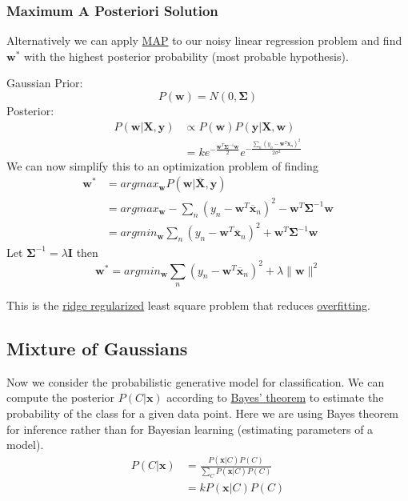\documentclass[12pt]{article}
\begin{document}
        \subsubsection{Maximum A Posteriori Solution}
            Alternatively we can apply \hyperref[sec:MAP]{MAP} to our noisy linear regression problem and find
            $\boldsymbol{w}^*$ with the highest posterior probability (most probable hypothesis).
            
            Gaussian Prior:
            $$ P(\boldsymbol{w}) = N(0, \boldsymbol{\Sigma}) $$ Posterior:
            \begin{align*}
                P(\boldsymbol{w} | \boldsymbol{X}, \boldsymbol{y}) &\propto P(\boldsymbol{w})P(\boldsymbol{y}|\boldsymbol{X}, \boldsymbol{w}) \\
                &= ke^{-\frac{\boldsymbol{w}^T\boldsymbol{\Sigma}^{-1}\boldsymbol{w}}{2}} e^{-\frac{\sum_n(y_n - \boldsymbol{w}^T\boldsymbol{x}_n)^2}{2\sigma^2}}
            \end{align*}
            We can now simplify this to an optimization problem of finding
            \begin{align*}
                \boldsymbol{w}^* &= argmax_{\boldsymbol{w}}P(\boldsymbol{w}|\overline{\boldsymbol{X}}, \boldsymbol{y}) \\
                &= argmax_{\boldsymbol{w}} - \sum_{n} (y_n - \boldsymbol{w}^T\overline{\boldsymbol{x}}_n)^2 - \boldsymbol{w}^T \boldsymbol{\Sigma}^{-1}\boldsymbol{w} \\
                &= argmin_{\boldsymbol{w}} \sum_{n} (y_n - \boldsymbol{w}^T \overline{\boldsymbol{x}}_n)^2 + \boldsymbol{w}^T \boldsymbol{\Sigma}^{-1}\boldsymbol{w}
            \end{align*}
            Let $\boldsymbol{\Sigma}^{-1} = \lambda \boldsymbol{I}$ then
            $$ \boldsymbol{w}^* = argmin_{\boldsymbol{w}} \sum_{n} (y_n - \boldsymbol{w}^T
            \overline{\boldsymbol{x}}_n)^2 + \lambda \|\boldsymbol{w}\|^2 $$

            This is the \hyperref[sec:RidgeReg]{ridge regularized} least square problem that reduces
            \hyperref[sec:Overfitting]{overfitting}.

    \subsection{Mixture of Gaussians}
        Now we consider the probabilistic generative model \label{fact:GenerativeModel} for classification. We can
        compute the posterior $P(C|\boldsymbol{x})$ according to \hyperref[fact:Bayes]{Bayes' theorem} to estimate the
        probability of the class for a given data point. Here we are using Bayes theorem for inference rather than for
        Bayesian learning (estimating parameters of a model).
        \begin{align*}
            P(C|\boldsymbol{x}) &= \frac{P(\boldsymbol{x}|C)P(C)}{\sum_C P(\boldsymbol{x}|C)P(C)} \\
            &= k P(\boldsymbol{x}|C)P(C)
        \end{align*}
\end{document}
